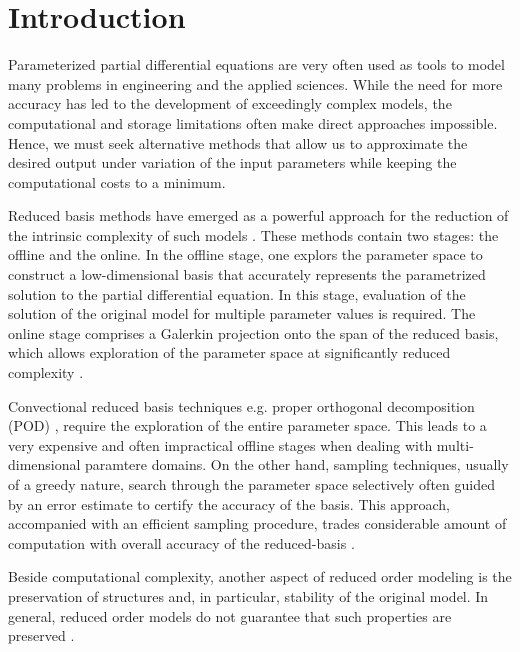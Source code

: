 \section{Introduction}
Parameterized partial differential equations are very often used as tools to model many problems in engineering and the applied sciences. While the need for more accuracy has led to the development of exceedingly complex models, the computational and storage limitations often make direct approaches impossible. Hence, we must seek alternative methods that allow us to approximate the desired output under variation of the input parameters while keeping the computational costs to a minimum.

Reduced basis methods have emerged as a powerful approach for the reduction of the intrinsic complexity of such models \cite{Ito:1998up,Ito:1998ch,Ito:2001ev,Peterson:1989ki}. These methods contain two stages: the offline and the online. In the offline stage, one explors the parameter space to construct a low-dimensional basis that accurately represents the parametrized solution to the partial differential equation. In this stage, evaluation of the solution of the original model for multiple parameter values is required. The online stage comprises a Galerkin projection onto the span of the reduced basis, which allows exploration of the parameter space at significantly reduced complexity \cite{Antoulas:2005:ALD:1088857,Anonymous:2016wl}.

Convectional reduced basis techniques e.g. proper orthogonal decomposition (POD) \cite{Kunisch:2002er,Atwell:2001ja,Ravindran:2002hn}, require the exploration of the entire parameter space. This leads to a very expensive and often impractical offline stages when dealing with multi-dimensional paramtere domains. On the other hand, sampling techniques, usually of a greedy nature, search through the parameter space selectively often guided by an error estimate to certify the accuracy of the basis. This approach, accompanied with an efficient sampling procedure, trades considerable amount of computation with overall accuracy of the reduced-basis \cite{Cuong:2005gd,Rozza:2005ie,Anonymous:2016wl}.

Beside computational complexity, another aspect of reduced order modeling is the preservation of structures and, in particular, stability of the original model. In general, reduced order models do not guarantee that such properties are preserved \cite{Anonymous:pMn0O0Q4}. 

